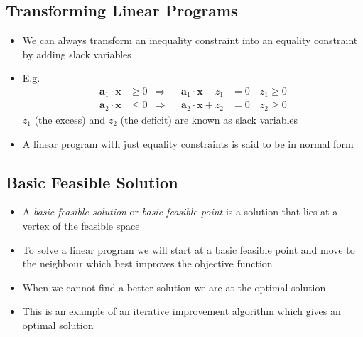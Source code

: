 
\begin{slide}
\section{Transforming Linear Programs}

\begin{PauseHighLight}
  \begin{itemize}
  \item We can always transform an inequality constraint into an
    equality constraint by adding slack variables
  \item E.g.
    \begin{align*}
      \bm{a}_1\cdot\bm{x} &\geq 0 &\Rightarrow& &
      \bm{a}_1\cdot\bm{x} - z_1 &=0 \quad z_1 \geq 0 \\ 
      \bm{a}_2\cdot\bm{x} &\leq 0 &\Rightarrow& &
      \bm{a}_2\cdot\bm{x} + z_2 &=0 \quad z_2 \geq 0
    \end{align*}
    $z_1$ (the excess) and $z_2$ (the deficit) are known as slack
    variables\pause
  \item A linear program with just equality constraints is said to be in
    normal form\pause
  \end{itemize}
\end{PauseHighLight}

\end{slide}

\Outline %

\begin{slide}
\section[-2]{Basic Feasible Solution}

\begin{PauseHighLight}
  \begin{itemize}
  \item A \textit{basic feasible solution} or \textit{basic feasible
      point} is a solution that lies at a vertex of the feasible space\pause
  \item To solve a linear program we will start at a basic feasible
    point and move to the neighbour which best improves the objective
    function\pause
  \item When we cannot find a better solution we are at the optimal
    solution\pause
  \item This is an example of an iterative improvement algorithm which
    gives an optimal solution\pause
  \end{itemize}
\end{PauseHighLight}

\end{slide}

